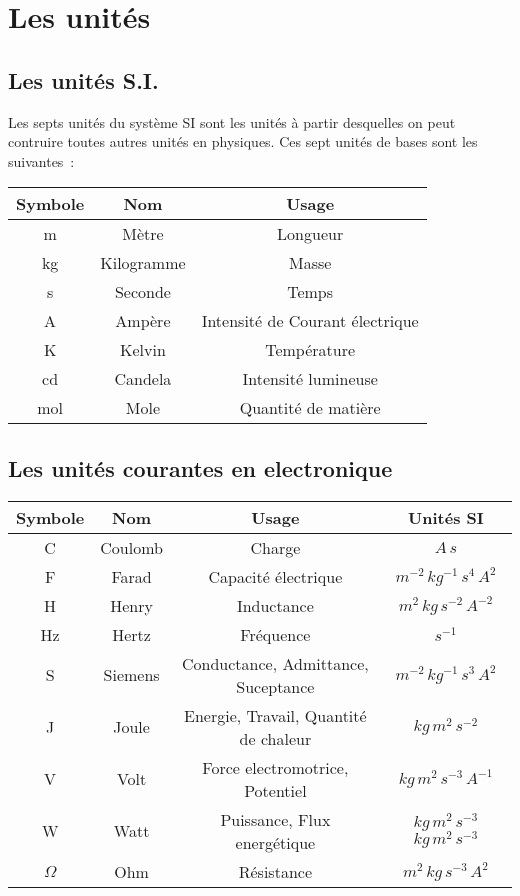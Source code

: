 \chapter{Les unités}

\section{Les unités S.I.}

Les septs unités du système SI sont les unités à partir desquelles on peut contruire toutes autres unités en physiques. Ces sept unités de bases sont les suivantes~:

\begin{center}
\bgroup
\def\arraystretch{1.2}%
\begin{tabular}{|c c c|}
	\hline
	\textbf{Symbole} & \textbf{Nom} & \textbf{Usage} \\
	\hline
	\hline
	m & Mètre & Longueur \\
	kg & Kilogramme & Masse \\
	s & Seconde & Temps \\
	A & Ampère & Intensité de Courant électrique \\
	K & Kelvin & Température \\
	cd & Candela & Intensité lumineuse \\
	mol & Mole & Quantité de matière \\
	\hline
\end{tabular}
\egroup
\end{center}

\section{Les unités courantes en electronique}
\begin{center}
\bgroup
\def\arraystretch{1.2}%
\begin{tabular}{|c c c c|}
	\hline
	\textbf{Symbole} & \textbf{Nom} & \textbf{Usage} & \textbf{Unités SI}  \\
	\hline
	\hline
	C & Coulomb & Charge & $A\,s$ \\
	F & Farad & Capacité électrique & $m^{-2}\,kg^{-1}\,s^{4}\,A^{2}$ \\
	H & Henry & Inductance & $m^2\,kg\,s^{-2}\,A^{-2}$ \\
	Hz & Hertz & Fréquence & $s^{-1}$ \\
	S & Siemens & Conductance, Admittance, Suceptance & $m^{-2}\,kg^{-1}\,s^{3}\,A^{2}$ \\
	J & Joule & Energie, Travail, Quantité de chaleur & $kg\,m^2\,s^{-2}$  \\
	V & Volt & Force electromotrice, Potentiel & $kg\,m^{2}\,s^{-3}\,A^{-1}$  \\
	W & Watt & Puissance, Flux energétique & $kg\,m^2\,s^{-3}$$kg\,m^2\,s^{-3}$ \\
	$\Omega$ & Ohm & Résistance & $m^2\,kg\,s^{-3}\,A^2$ \\
	\hline
\end{tabular}
\egroup
\end{center}

